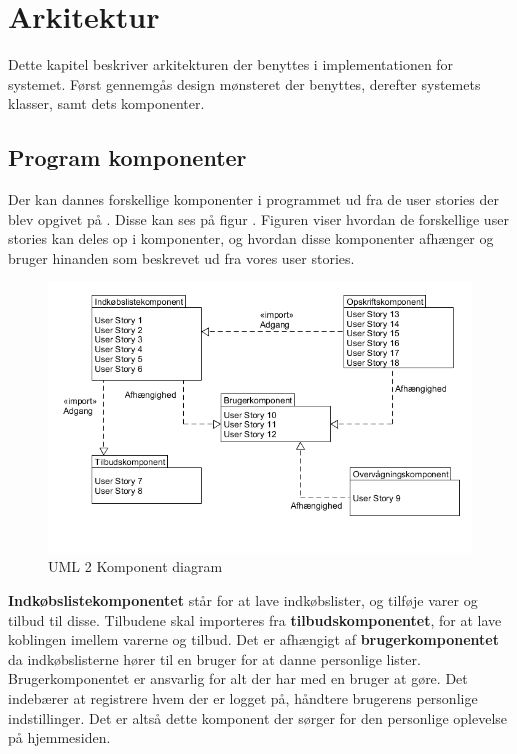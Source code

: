 \section{Arkitektur}
Dette kapitel beskriver arkitekturen der benyttes i implementationen for systemet.
Først gennemgås design mønsteret der benyttes, derefter systemets klasser, samt dets komponenter.




\subsection{Program komponenter}\label{subsec:komp}

Der kan dannes forskellige komponenter i programmet ud fra de user stories der blev opgivet på . 
Disse kan ses på figur .
Figuren viser hvordan de forskellige user stories kan deles op i komponenter, og hvordan disse komponenter afhænger og bruger hinanden som beskrevet ud fra vores user stories.

\begin{figure}
	
	\vspace{-20pt}
	\begin{center}
		\includegraphics[scale=0.6]{images/Diagrams/Komponenter.png}
	\end{center}
	\vspace{-20pt}
	\caption{UML 2 Komponent diagram }
	\label{figure:komp}
	\vspace{-20pt}
\end{figure}

\textbf{Indkøbslistekomponentet} står for at lave indkøbslister, og tilføje varer og tilbud til disse.
Tilbudene skal importeres fra \textbf{tilbudskomponentet}, for at lave koblingen imellem varerne og tilbud.
Det er afhængigt af \textbf{brugerkomponentet} da indkøbslisterne hører til en bruger for at danne personlige lister. Brugerkomponentet er ansvarlig for alt der har med en bruger at gøre. Det indebærer at registrere hvem der er logget på, håndtere brugerens personlige indstillinger. Det er altså dette komponent der sørger for den personlige oplevelse på hjemmesiden.

